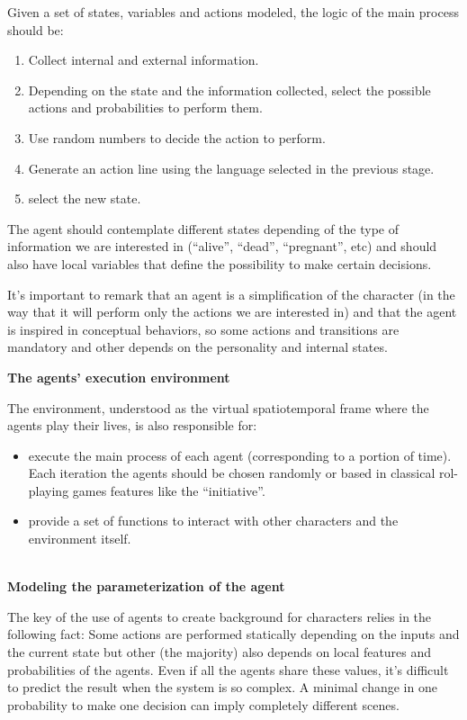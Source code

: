 \documentclass{sig-alternate}
\begin{document}
Given a set of states, variables and actions modeled, the logic of the main process should be:

\begin{enumerate}
\item Collect internal and external information.
\item Depending on the state and the information collected, select the possible actions and probabilities to perform them.
\item Use random numbers to decide the action to perform.
\item Generate an action line using the language selected in the previous stage.
\item select the new state.
\end{enumerate}


The agent should contemplate different states depending of the type of information we are interested in (``alive'', ``dead'', ``pregnant'', etc) and should also have local variables that define the possibility to make certain decisions.

It's important to remark that an agent is a simplification of the character (in the way that it will perform only the actions we are interested in) and that the agent is inspired in conceptual behaviors, so some actions and transitions are mandatory and other depends on the personality and internal states.

\textbf{The agents' execution environment}

The environment, understood as the virtual spatiotemporal frame where the agents play their lives, is also responsible for:
\begin{itemize}
\item execute the main process of each agent (corresponding to a portion of time). Each iteration the agents should be chosen randomly or based in classical rol-playing games features like the ``initiative''.
\item provide a set of functions to interact with other characters and the environment itself.
\end{itemize}\\


\textbf{Modeling the parameterization of the agent}

The key of the use of agents to create background for characters relies in the following fact: Some actions are performed statically depending on the inputs and the current state but other (the majority) also depends on local features and probabilities of the agents. Even if all the agents share these values, it's difficult to predict the result when the system is so complex. A minimal change in one probability to make one decision can imply completely different scenes.\\
\end{document}

